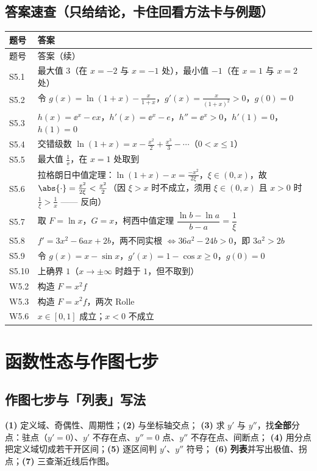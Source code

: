 \documentclass[11pt,a4paper]{ctexart}
\begin{document}
\subsection{答案速查（只给结论，卡住回看方法卡与例题）}
{\footnotesize
\begin{longtable}{@{}p{1.6cm}p{13.0cm}@{}}
\toprule 题号 & 答案 \\ \midrule
\endfirsthead
\toprule 题号 & 答案（续） \\ \midrule
\endhead
\midrule
\endfoot
\bottomrule
\endlastfoot
S5.1 & 最大值 $3$（在 $x=-2$ 与 $x=-1$ 处），最小值 $-1$（在 $x=1$ 与 $x=2$ 处） \\
S5.2 & 令 $g(x)=\ln(1+x)-\frac{x}{1+x}$，$g'(x)=\frac{x}{(1+x)^{2}}>0$，$g(0)=0$ \\
S5.3 & $h(x)=\ee^{x}-ex$，$h'(x)=\ee^{x}-e$，$h''=\ee^{x}>0$，$h'(1)=0$，$h(1)=0$ \\
S5.4 & 交错级数 $\ln(1+x)=x-\frac{x^{2}}2+\frac{x^{3}}3-\cdots$（$0<x\leq1$） \\
S5.5 & 最大值 $\frac1\ee$，在 $x=1$ 处取到 \\
S5.6 & 拉格朗日中值定理：$\ln(1+x)-x=\frac{-x^{2}}{2\xi}$，$\xi\in(0,x)$，故 $\abs{\cdot}=\frac{x^{2}}{2\xi}<\frac{x^{2}}{2}$（因 $\xi>x$ 时不成立，须用 $\xi\in(0,x)$ 且 $x>0$ 时 $\frac{1}{\xi}>\frac1x$ —— 反向） \\
S5.7 & 取 $F=\ln x$，$G=x$，柯西中值定理 $\dfrac{\ln b-\ln a}{b-a}=\dfrac{1}{\xi}$ \\
S5.8 & $f'=3x^{2}-6ax+2b$，两不同实根 $\iff 36a^{2}-24b>0$，即 $3a^{2}>2b$ \\
S5.9 & 令 $g(x)=x-\sin x$，$g'(x)=1-\cos x\geq0$，$g(0)=0$ \\
S5.10 & 上确界 $1$（$x\to\pm\infty$ 时趋于 $1$，但不取到） \\
W5.2 & 构造 $F=x^2f$ \\
W5.3 & 构造 $F=x^2f$，两次 Rolle \\
W5.6 & $x\in[0,1]$ 成立；$x<0$ 不成立
\end{longtable}}

\bigskip
\section{函数性态与作图七步}
\subsection{作图七步与「列表」写法}

\begin{keypoint}[七步（练到机械）]
\textbf{(1)} 定义域、奇偶性、周期性；\textbf{(2)} 与坐标轴交点；
\textbf{(3)} 求 $y'$ 与 $y''$，找\textbf{全部}分点：驻点（$y'=0$）、$y'$ 不存在点、$y''=0$ 点、$y''$ 不存在点、间断点；
\textbf{(4)} 用分点把定义域切成若干开区间；\textbf{(5)} 逐区间判 $y'$、$y''$ 符号；
\textbf{(6)} \textbf{列表}并写出极值、拐点；\textbf{(7)} 三查渐近线后作图。
\end{keypoint}
\end{document}
